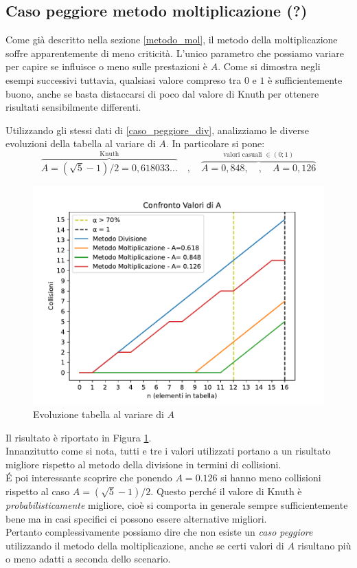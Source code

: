 \subsection{Caso peggiore metodo moltiplicazione (?)} \label{worst_case_mol}
Come già descritto nella sezione \ref{metodo_mol}, il metodo della moltiplicazione soffre apparentemente di meno criticità. L'unico parametro che possiamo variare per capire se influisce o meno sulle prestazioni è $A$. Come si dimostra negli esempi successivi tuttavia, qualsiasi valore compreso tra $0$ e $1$ è sufficientemente buono, anche se basta distaccarsi di poco dal valore di Knuth per ottenere risultati sensibilmente differenti.


Utilizzando gli stessi dati di \ref{caso_peggiore_div}, analizziamo le diverse evoluzioni della tabella al variare di $A$. In particolare si pone:
\[
\overbrace{A=(\sqrt{5}-1)/2 = 0,618033...}^{\text{Knuth}} \quad , \quad \overbrace{A=0,848, \quad , \quad A=0,126}^{\text{valori casuali } \in (0;1)}
\]

\begin{figure}[h]
    \begin{center}
    \includegraphics[scale=0.65]{src/img/worstcase_mul.pdf}
    \caption{Evoluzione tabella al variare di $A$}
     \label{fig:worstcase_mul}
    \end{center}
\end{figure}
Il risultato è riportato in Figura \ref{fig:worstcase_mul}. \\ 
Innanzitutto come si nota, tutti e tre i valori utilizzati portano a un risultato migliore rispetto al metodo della divisione in termini di collisioni. \\ 
\'E poi interessante scoprire che ponendo $A = 0.126$ si hanno meno collisioni rispetto al caso $A=(\sqrt{5}-1)/2$. Questo perché il valore di Knuth è \emph{probabilisticamente} migliore, cioè si comporta in generale sempre sufficientemente bene ma in casi specifici ci possono essere alternative migliori. \\
Pertanto complessivamente possiamo dire che non esiste un \emph{caso peggiore} utilizzando il metodo della moltiplicazione, anche se certi valori di $A$ risultano più o meno adatti a seconda dello scenario.